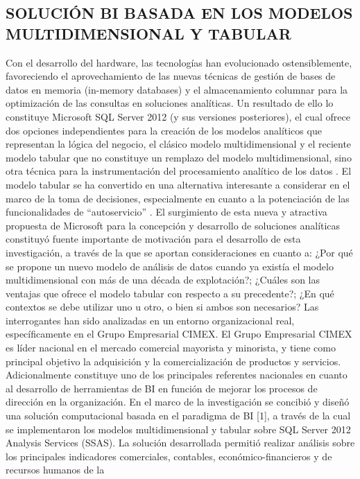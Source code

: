 \documentclass[%
 reprint,
 amsmath,amssymb,
 aps,
]{revtex4-1}
\begin{document}
\subsection{SOLUCIÓN BI BASADA EN LOS MODELOS MULTIDIMENSIONAL Y TABULAR}	
Con el desarrollo del hardware, las tecnologías han
evolucionado ostensiblemente, favoreciendo el
aprovechamiento de las nuevas técnicas de gestión de bases de
datos en memoria (in-memory databases) y el almacenamiento
columnar para la optimización de las consultas en soluciones
analíticas.
 Un resultado de ello lo constituye Microsoft SQL
Server 2012 (y sus versiones posteriores), el cual ofrece dos
opciones independientes para la creación de los modelos
analíticos que representan la lógica del negocio, el clásico
modelo multidimensional y el reciente modelo tabular que no
constituye un remplazo del modelo multidimensional, sino
otra técnica para la instrumentación del procesamiento
analítico de los datos . 
El modelo tabular se ha convertido
en una alternativa interesante a considerar en el marco de la
toma de decisiones, especialmente en cuanto a la potenciación
de las funcionalidades de “autoservicio” .
El surgimiento de esta nueva y atractiva propuesta de
Microsoft para la concepción y desarrollo de soluciones
analíticas constituyó fuente importante de motivación para el
desarrollo de esta investigación, a través de la que se aportan
consideraciones en cuanto a:
 ¿Por qué se propone un nuevo modelo de análisis de datos cuando ya existía el modelo multidimensional con más de una década de explotación?;
¿Cuáles son las ventajas que ofrece el modelo tabular con
respecto a su precedente?; ¿En qué contextos se debe utilizar
uno u otro, o bien si ambos son necesarios? Las interrogantes
han sido analizadas en un entorno organizacional real,
específicamente en el Grupo Empresarial CIMEX.
El Grupo Empresarial CIMEX es líder nacional en el
mercado comercial mayorista y minorista, y tiene como
principal objetivo la adquisición y la comercialización de
productos y servicios. Adicionalmente constituye uno de los
principales referentes nacionales en cuanto al desarrollo de
herramientas de BI en función de mejorar los procesos de
dirección en la organización.
En el marco de la investigación se concibió y diseñó una
solución computacional basada en el paradigma de BI [1], a
través de la cual se implementaron los modelos
multidimensional y tabular sobre SQL Server 2012 Analysis
Services (SSAS). La solución desarrollada permitió realizar
análisis sobre los principales indicadores comerciales,
contables, económico-financieros y de recursos humanos de la
\end{document}
